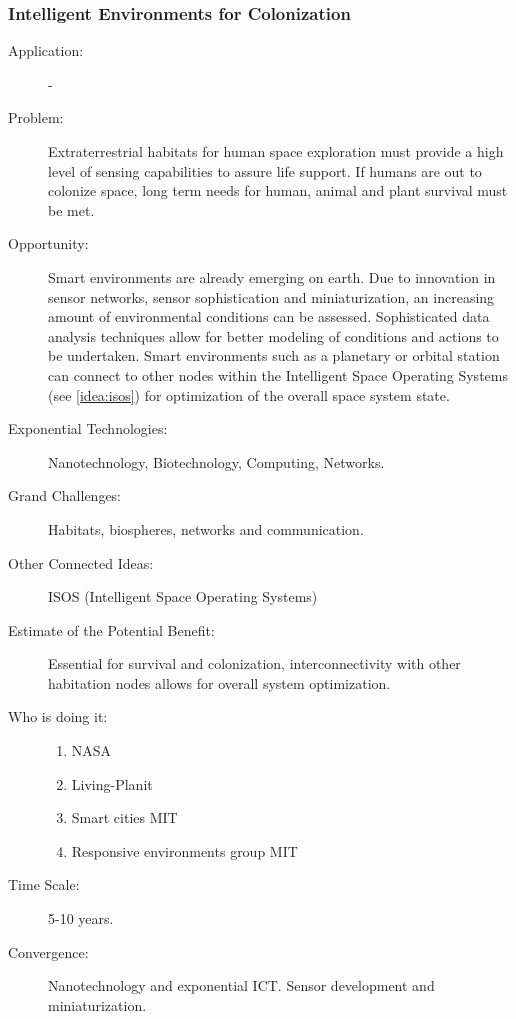     \subsubsection{Intelligent Environments for Colonization} 
    \label{i2e}
\begin{description}  \item[Application:] -
 
   \item[Problem:] Extraterrestrial habitats for human space exploration  must provide a high level of sensing capabilities to assure life  support. If humans are out to colonize space, long term needs for human,  animal and plant survival must be met.
  
   \item[Opportunity:] Smart environments are already emerging on earth.  Due to innovation in sensor networks, sensor sophistication and  miniaturization, an increasing amount of environmental conditions can be  assessed. Sophisticated data analysis techniques allow for better  modeling of conditions and actions to be undertaken. Smart environments  such as a planetary or orbital station can connect to other nodes within  the Intelligent Space Operating Systems (see \autoref{idea:isos}) for optimization of  the overall space system state.
 
   \item[Exponential Technologies:] Nanotechnology, Biotechnology,  Computing, Networks.
 
   \item[Grand Challenges:] Habitats, biospheres, networks and  communication.
 
   \item[Other Connected Ideas:]  ISOS (Intelligent Space Operating  Systems)
 
   \item[Estimate of the Potential Benefit:] Essential for survival and  colonization, interconnectivity with other habitation nodes allows for  overall system optimization.
 
   \item[Who is doing it:]
  \hfill\begin{enumerate} 
     \item NASA
     \item Living-Planit
     \item Smart cities  MIT
    \item Responsive environments group MIT
     \end{enumerate}
 
   \item[Time Scale:] 5-10 years.
 
   \item[Convergence:] Nanotechnology and exponential ICT. Sensor development  and miniaturization.
   \end{description}

